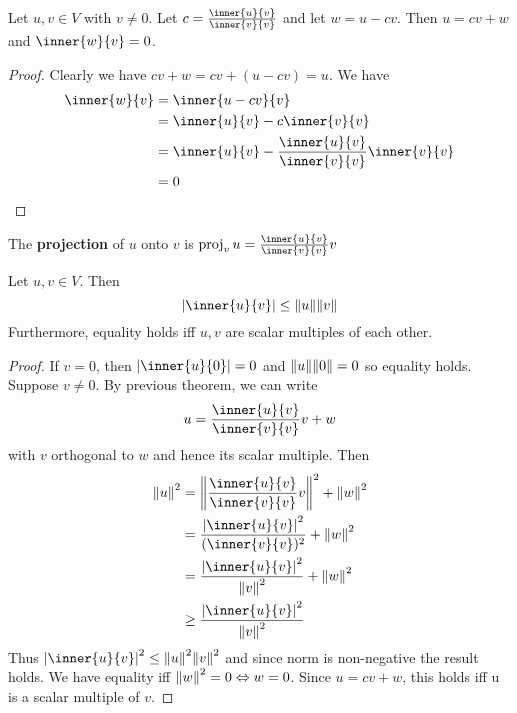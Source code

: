 \documentclass{article}
\DeclareMathOperator{\proj}{proj}
\begin{document}
\begin{theorem}
  Let $u, v \in V$ with $v \neq 0$. Let $c = \frac{\inner{u}{v}}{\inner{v}{v}}$ and let $w = u -cv$. Then $u = cv + w$ and $\inner{w}{v} = 0$.
\end{theorem}
\begin{proof}
  Clearly we have $cv + w = cv + (u-cv) = u$. We have
  \begin{align*}
    \inner{w}{v} & = \inner{u-cv}{v}                                               \\
                 & = \inner{u}{v} - c\inner{v}{v}                                  \\
                 & = \inner{u}{v} - \frac{\inner{u}{v}}{\inner{v}{v}} \inner{v}{v} \\
                 & = 0                                                             \\
  \end{align*}
\end{proof}
\begin{definition}
  The \textbf{projection} of $u$ onto $v$ is $\proj_vu = \frac{\inner{u}{v}}{\inner{v}{v}}v$
\end{definition}
\begin{cthm}
  Let $u, v \in V$. Then \[
    \abs{\inner{u}{v}} \leq \norm{u}\norm{v}
  \]
  Furthermore, equality holds iff $u, v$ are scalar multiples of each other.
\end{cthm}
\begin{proof}
  If $v = 0$, then $\abs{\inner{u}{0}} = 0$ and $\norm{u}\norm{0} = 0$ so equality holds. Suppose $v \neq 0$. By previous theorem, we can write \[
    u = \frac{\inner{u}{v}}{\inner{v}{v}}v + w
  \] with $v$ orthogonal to $w$ and hence its scalar multiple. Then
  \begin{align*}
    \norm{u}^2 & = \norm{\frac{\inner{u}{v}}{\inner{v}{v}}v}^2 + \norm{w}^2   \\
               & = \frac{\abs{\inner{u}{v}}^2}{(\inner{v}{v})^2} + \norm{w}^2 \\
               & = \frac{\abs{\inner{u}{v}}^2}{\norm{v}^2} + \norm{w}^2       \\
               & \geq \frac{\abs{\inner{u}{v}}^2}{\norm{v}^2}
  \end{align*}
  Thus $\abs{\inner{u}{v}}^2 \leq \norm{u}^2 \norm{v}^2$ and since norm is non-negative the result holds. We have equality iff $\norm{w}^2 = 0 \Leftrightarrow w = 0$. Since $u = cv + w$, this holds iff u is a scalar multiple of $v$.
\end{proof}
\end{document}
